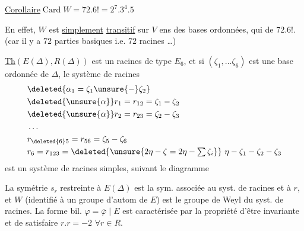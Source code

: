 
\uline{Corollaire}\quad $\operatorname{Card} W=72\mathbin.6!=2^7\mathbin.3^4\mathbin.5$

En effet, $W$ est \uline{simplement} \uline{transitif} sur $V$ ens des bases ordonnées, qui  de $72\mathbin.6!$. (car il y a $72$ parties basiques i.e. $72$ racines \ldots)

\uline{Th}\quad $(E(\Delta),R(\Delta))$ est un   racines de type $E_6$,  et si $(\zeta_1,\ldots\zeta_6)$ est une base ordonnée de $\Delta$, le système de racines
\[
\begin{aligned}
&\deleted{\alpha_1=\zeta_1\unsure{-}\zeta_2}\\
&\deleted{\unsure{\alpha}}r_1=r_{12}=\zeta_1-\zeta_2\\
&\deleted{\unsure{\alpha}}r_2=r_{23}=\zeta_2-\zeta_3\\
&\ldots\\
&r_{\deleted{6}5}=r_{56}=\zeta_5-\zeta_6\\
&r_6=r_{123}=\deleted{\unsure{2\eta-\zeta=2\eta-\textstyle\sum\zeta_i}}\ \eta-\zeta_1-\zeta_2-\zeta_3
\end{aligned}
\]
est un système de racines simples, suivant le diagramme

 La symétrie $s_r$ restreinte à $E(\Delta)$ est la sym. associée au syst. de racines et à $r$, et $W$ (identifié à un groupe d'autom de $E$) est  le groupe de Weyl du syst. de racines. La forme bil.  $\varphi=\overline\varphi\mid E$ est caractérisée par la propriété d'être invariante  et de satisfaire $r.r=-2$ $\forall r\in R$.
